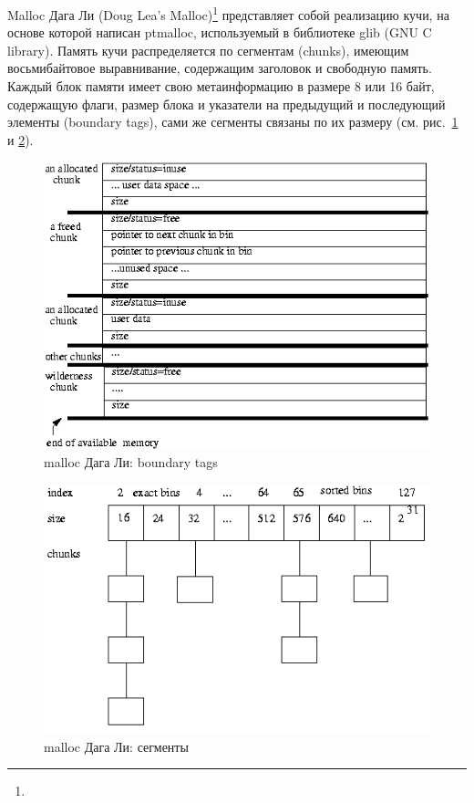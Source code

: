 Malloc Дага Ли (Doug Lea's Malloc)\footnote{}
представляет собой реализацию кучи, на основе которой
написан ptmalloc, используемый в библиотеке glib (GNU C library). Память кучи распределяется по сегментам (chunks), имеющим
восьмибайтовое выравнивание, содержащим заголовок и свободную память. Каждый блок памяти имеет свою метаинформацию в размере
8 или 16 байт, содержащую флаги, размер блока и указатели на предыдущий и последующий элементы (boundary tags),
сами же сегменты связаны по их размеру (см. рис.~\ref{boundary_tags} и \ref{bindings}).

\begin{figure}[t]
  \centering
  \includegraphics[width=\linewidth]{Berezun/images/boundaryTags.png}
  \caption{malloc Дага Ли: boundary tags}
  \label{boundary_tags}
\end{figure}

\begin{figure}[t]
  \centering
  \includegraphics[width=\linewidth]{Berezun/images/binding.png}
  \caption{malloc Дага Ли: сегменты}
  \label{bindings}
\end{figure}

